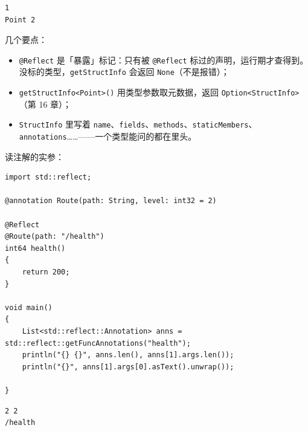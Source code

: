 \par
\medskip
\begin{lstlisting}[style=out]
1
Point 2
\end{lstlisting}
\par
\medskip

几个要点：

\begin{itemize}

\item \texttt{@Reflect} 是「暴露」标记：只有被 \texttt{@Reflect} 标过的声明，运行期才查得到。没标的类型，\texttt{get\allowbreak{}Struct\allowbreak{}Info} 会返回 \texttt{None}（不是报错）；

\item \texttt{get\allowbreak{}Struct\allowbreak{}Info<\allowbreak{}Point>\allowbreak{}(\allowbreak{})\allowbreak{}} 用类型参数取元数据，返回 \texttt{Option<\allowbreak{}Struct\allowbreak{}Info>\allowbreak{}}（第 16 章）；

\item \texttt{Struct\allowbreak{}Info} 里写着 \texttt{name}、\texttt{fields}、\texttt{methods}、\texttt{static\allowbreak{}Members}、\texttt{annotations}……——一个类型能问的都在里头。

\end{itemize}

读注解的实参：

\par
\medskip
\begin{lstlisting}[style=chali]
import std::reflect;

@annotation Route(path: String, level: int32 = 2)

@Reflect
@Route(path: "/health")
int64 health()
{
    return 200;
}

void main()
{
    List<std::reflect::Annotation> anns = std::reflect::getFuncAnnotations("health");
    println("{} {}", anns.len(), anns[1].args.len());
    println("{}", anns[1].args[0].asText().unwrap());

}
\end{lstlisting}
\par
\medskip

\par
\medskip
\begin{lstlisting}[style=out]
2 2
/health
\end{lstlisting}
\par
\medskip

